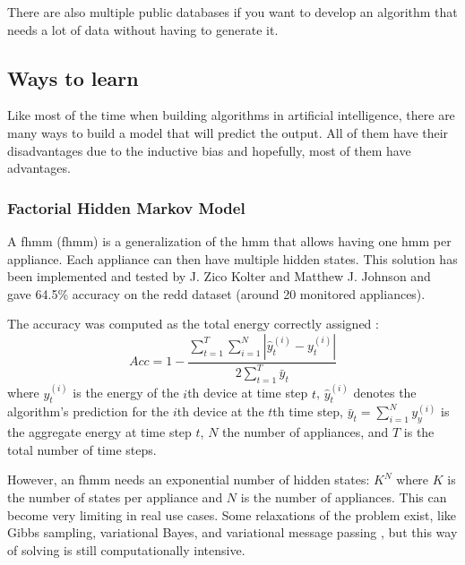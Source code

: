 There are also multiple public databases if you want to develop an algorithm that needs a lot of data without having to generate it.%




\subsection{Ways to learn}\label{setion:learn}
Like most of the time when building algorithms in artificial intelligence, there are many ways to build a model that will predict the output. All of them have their disadvantages due to the inductive bias and hopefully, most of them have advantages.
\subsubsection{Factorial Hidden Markov Model}
A \acrlong{fhmm} (\acrshort{fhmm}) is a generalization of the \acrshort{hmm} that allows having one \acrshort{hmm} per appliance. \cite{parson2014unsupervised} Each appliance can then have multiple hidden states. This solution has been implemented and tested by J. Zico Kolter and Matthew J. Johnson \cite{kolter2011redd} and gave 64.5\% accuracy on the \acrshort{redd} dataset (around 20 monitored appliances).

The accuracy was computed as the total energy correctly assigned :
\begin{equation}Acc=1-\frac{\sum_{t=1}^{T}\sum_{i=1}^{N}|\hat{y}_t^{(i)}-y_t^{(i)}|}{2\sum_{t=1}^{T} \bar{y}_t}\end{equation}
where $y_t^{(i)}$ is the energy of the $i$th device at time step $t$, $\hat{y}_t^{(i)}$ denotes the algorithm’s prediction for the $i$th device at the $t$th time step, $\bar{y}_t=\sum_{i=1}^{N}y_y^{(i)}$ is the aggregate energy at time step $t$, $N$ the number of appliances, and $T$ is the total number of time steps.

However, an \acrshort{fhmm} needs an exponential number of hidden states: $K^N$ where $K$ is the number of states per appliance and $N$ is the number of appliances. This can become very limiting in real use cases. Some relaxations of the problem exist, like Gibbs sampling, variational Bayes, and variational message passing \cite{parson2014unsupervised}, but this way of solving is still computationally intensive.

